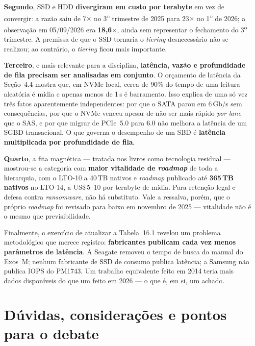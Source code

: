 \documentclass[11pt,a4paper]{article}
\begin{document}
\textbf{Segundo}, SSD e HDD \textbf{divergiram em custo por terabyte} em vez de convergir:
a razão saiu de 7$\times$ no 3\textsuperscript{o} trimestre de 2025 para 23$\times$ no
1\textsuperscript{o} de 2026; a observação em 05/09/2026 era \textbf{18,6$\times$}, ainda
sem representar o fechamento do 3\textsuperscript{o} trimestre. A premissa de que o SSD tornaria o
\emph{tiering} desnecessário não se realizou; ao contrário, o \emph{tiering} ficou mais
importante.

\textbf{Terceiro}, e mais relevante para a disciplina, \textbf{latência, vazão e
profundidade de fila precisam ser analisadas em conjunto}. O orçamento de latência da Seção~4.4 mostra que, em NVMe
local, cerca de 90\% do tempo de uma leitura aleatória é mídia e apenas menos de
1\,\textmu s é barramento. Isso explica de uma só vez três fatos aparentemente
independentes: por que o SATA parou em 6\,Gb/s sem consequências, por que o NVMe venceu
apesar de não ser mais rápido \emph{por lane} que o SAS, e por que migrar de PCIe~5.0 para
6.0 não melhora a latência de um SGBD transacional. O que governa o desempenho de um SBD é
\textbf{latência multiplicada por profundidade de fila}.

\textbf{Quarto}, a fita magnética --- tratada nos livros como tecnologia residual ---
mostrou-se a categoria com \textbf{maior vitalidade de \emph{roadmap}} de toda a hierarquia,
com o LTO-10 a 40\,TB nativos e \emph{roadmap} publicado até \textbf{365\,TB nativos} no
LTO-14, a US\$\,5--10 por terabyte de mídia. Para retenção legal e defesa contra
\emph{ransomware}, não há substituto. Vale a ressalva, porém, que o próprio \emph{roadmap}
foi revisado para baixo em novembro de 2025 --- vitalidade não é o mesmo que previsibilidade.

Finalmente, o exercício de atualizar a Tabela~16.1 revelou um problema metodológico que
merece registro: \textbf{fabricantes publicam cada vez menos parâmetros de latência}. A
Seagate removeu o tempo de busca do manual do Exos~M; nenhum fabricante de SSD de consumo
publica latência; a Samsung não publica IOPS do PM1743. Um trabalho equivalente feito em
2014 teria mais dados disponíveis do que um feito em 2026 --- o que é, em si, um achado.

\section{Dúvidas, considerações e pontos para o debate}
\end{document}

